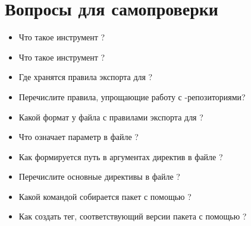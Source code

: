 \section{Вопросы для самопроверки}

\begin{itemize}
	\item Что такое инструмент ?
	\item Что такое инструмент ?
	\item Где хранятся правила экспорта для ?
	\item Перечислите правила, упрощающие работу с -репозиториями?
	\item Какой формат у файла с правилами экспорта для ?
	\item Что означает параметр  в файле ?
	\item Как формируется путь в аргументах директив в файле ?
	\item Перечислите основные директивы в файле ?
	\item Какой командой собирается пакет с помощью ?
	\item Как создать тег, соответствующий версии пакета с помощью ?
\end{itemize}
